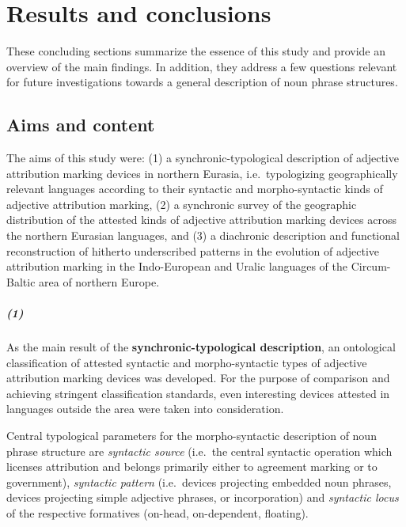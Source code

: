 
\chapter{Results and conclusions}
These concluding sections summarize the essence of this study and provide an overview of the main findings. In addition, they address a few questions relevant for future investigations towards a general description of noun phrase structures.

\section{Aims and content}
The aims of this study were: (1) a synchronic-typological description of adjective attribution marking devices in northern Eurasia, i.e.~typologizing geographically relevant languages according to their syntactic and morpho-syntactic kinds of adjective attribution marking, (2) a synchronic survey of the geographic distribution of the attested kinds of adjective attribution marking devices across the northern Eurasian languages, and (3) a diachronic description and functional reconstruction of hitherto underscribed patterns in the evolution of adjective attribution marking in the Indo-European and Uralic languages of the Circum-Baltic area of northern Europe.

\paragraph{(1)}
As the main result of the \textbf{synchronic-typological description}, an ontological classification of attested syntactic and morpho-syntactic types of adjective attribution marking devices was developed. For the purpose of comparison and achieving stringent classification standards, even interesting devices attested in languages outside the area were taken into consideration. 

Central typological parameters for the morpho-syntactic description of noun phrase structure are \textit{syntactic source} (i.e.~the central syntactic operation which licenses attribution and belongs primarily either to agreement marking or to government), \textit{syntactic pattern} (i.e.~devices projecting embedded noun phrases, devices projecting simple adjective phrases, or incorporation) and \textit{syntactic locus} of the respective formatives (on-head, on-dependent, floating).

